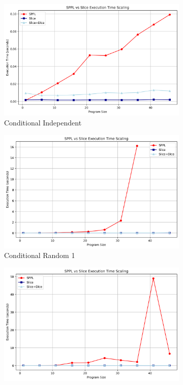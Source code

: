 \begin{figure}[!t]
\centering
\begin{subfigure}{0.32\textwidth}
\includegraphics[width=\textwidth]{../images/scaling/build_conditional_independent_contdice.png}
\caption{Conditional Independent}
\end{subfigure}
\hfill
\begin{subfigure}{0.32\textwidth}
\includegraphics[width=\textwidth]{../images/scaling/build_conditional_random_independent_contdice_1.png}
\caption{Conditional Random 1}
\end{subfigure}
\hfill
\begin{subfigure}{0.32\textwidth}
\includegraphics[width=\textwidth]{../images/scaling/build_conditional_random_independent_contdice_2.png}

\end{subfigure}
\end{figure}
